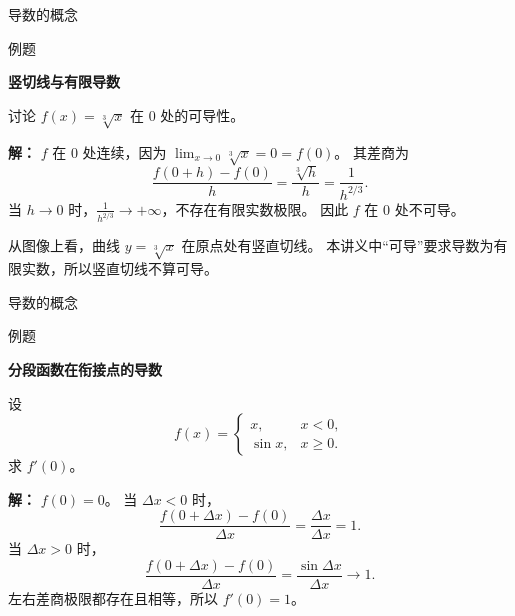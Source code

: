 \documentclass[aspectratio=169,10pt,fontset=fandol]{ctexbeamer}
\newenvironment{warning}{\par\noindent\textbf{注：}\quad}{\par\vspace{0.8em}}
\begin{document}
\begin{frame}[t,fragile]{导数的概念}
\normalsize
\begin{block}{例题}
{\normalsize
\textbf{竖切线与有限导数}\par

讨论 $f(x)=\sqrt[3]{x}$ 在 $0$ 处的可导性。

}
\end{block}
\pause
{\normalsize
\textbf{解：}
$f$ 在 $0$ 处连续，因为 $\lim_{x\to0}\sqrt[3]{x}=0=f(0)$。 其差商为
\[
\frac{f(0+h)-f(0)}{h}=\frac{\sqrt[3]{h}}{h}=\frac1{h^{2/3}}.
\]
当 $h\to0$ 时，$\frac1{h^{2/3}}\to+\infty$，不存在有限实数极限。 因此 $f$ 在 $0$ 处不可导。

从图像上看，曲线 $y=\sqrt[3]{x}$ 在原点处有竖直切线。 本讲义中“可导”要求导数为有限实数，所以竖直切线不算可导。

}
\end{frame}
\begin{frame}[t,fragile]{导数的概念}
\footnotesize
\begin{block}{例题}
{\footnotesize
\textbf{分段函数在衔接点的导数}\par

设
\[
f(x)=
\begin{cases}
x,&x<0,\\
\sin x,&x\geq0.
\end{cases}
\]
求 $f'(0)$。

}
\end{block}
\pause
{\footnotesize
\textbf{解：}
$f(0)=0$。 当 $\Delta x<0$ 时，
\[
\frac{f(0+\Delta x)-f(0)}{\Delta x}=\frac{\Delta x}{\Delta x}=1.
\]
当 $\Delta x>0$ 时，
\[
\frac{f(0+\Delta x)-f(0)}{\Delta x}=\frac{\sin\Delta x}{\Delta x}\to1.
\]
左右差商极限都存在且相等，所以 $f'(0)=1$。

}
\end{frame}
\end{document}

